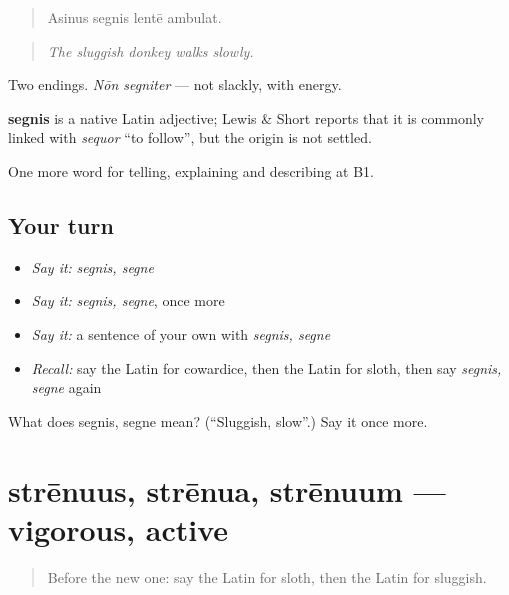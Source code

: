 \begin{quote}
Asinus segnis lentē ambulat.
\end{quote}

\begin{quote}
\emph{The sluggish donkey walks slowly.}
\end{quote}

Two endings. \emph{Nōn segniter} — not slackly, with energy.

\begin{cousinweb}
\textbf{segnis} is a native Latin adjective; Lewis \& Short reports that it is commonly linked with \emph{sequor} \textquotedblleft{}to follow\textquotedblright{}, but the origin is not settled.
\end{cousinweb}

\begin{grammarlens}[title={What you've built}]
One more word for telling, explaining and describing at B1.
\end{grammarlens}

\subsection*{Your turn}
\begin{itemize}
\raggedright
  \item \emph{Say it:} \emph{segnis, segne}
  \item \emph{Say it:} \emph{segnis, segne}, once more
  \item \emph{Say it:} a sentence of your own with \emph{segnis, segne}
  \item \emph{Recall:} say the Latin for cowardice, then the Latin for sloth, then say \emph{segnis, segne} again
\end{itemize}

\begin{tcolorbox}[breakable,colback=teal!4,colframe=teal!35!black,title={Before you move on}]
What does segnis, segne mean? (\textquotedblleft{}Sluggish, slow\textquotedblright{}.) Say it once more.
\end{tcolorbox}
\section[strēnuus, strēnua, strēnuum]{strēnuus, strēnua, strēnuum — vigorous, active}

\label{lesson:LA-C508-strenuus}



\begin{quote}
Before the new one: say the Latin for sloth, then the Latin for sluggish.
\end{quote}

